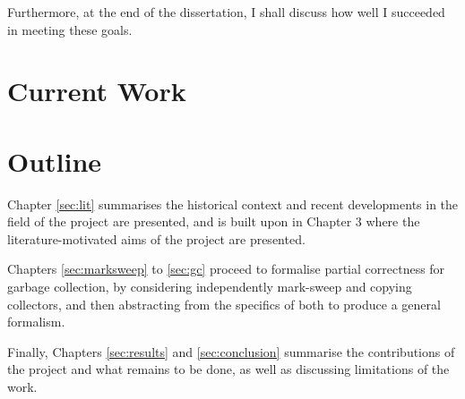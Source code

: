 Furthermore, at the end of the dissertation, I shall discuss how well
I succeeded in meeting these goals.

\section{Current Work}
\label{sec:intro-current}



\section{Outline}
\label{sec:intro-outline}

Chapter \ref{sec:lit} summarises the historical context and recent
developments in the field of the project are presented, and is built
upon in Chapter 3 where the literature-motivated aims of the project
are presented.

Chapters \ref{sec:marksweep} to \ref{sec:gc} proceed to formalise
partial correctness for garbage collection, by considering
independently mark-sweep and copying collectors, and then abstracting
from the specifics of both to produce a general formalism.

Finally, Chapters \ref{sec:results} and \ref{sec:conclusion} summarise
the contributions of the project and what remains to be done, as well
as discussing limitations of the work.
